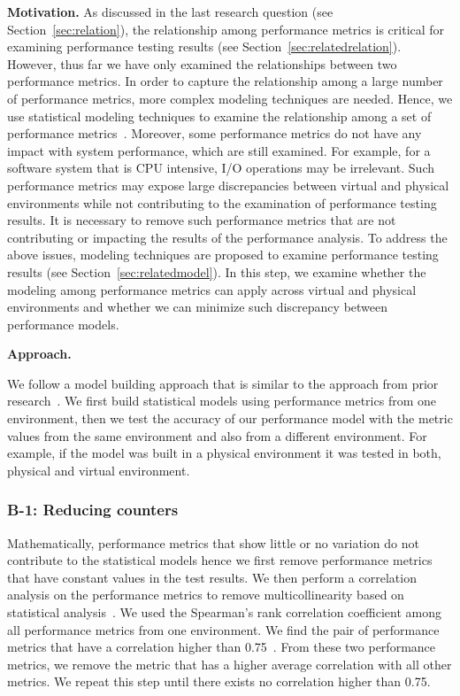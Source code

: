 \documentclass[smallextended]{svjour3}       %
\begin{document}
\noindent \textbf{Motivation.}
As discussed in the last research question (see Section~\ref{sec:relation}), the relationship among performance metrics is critical for examining performance testing results (see Section~\ref{sec:relatedrelation}). However, thus far we have only examined the relationships between two performance metrics. In order to capture the relationship among a large number of performance metrics, more complex modeling techniques are needed. Hence, we use statistical modeling techniques to examine the relationship among a set of performance metrics~\cite{xiong2013vperfguard,cohen2004correlating}. Moreover, some performance metrics do not have any impact with system performance, which are still examined. For example, for a software system that is CPU intensive, I/O operations may be irrelevant. Such performance metrics may expose large discrepancies between virtual and physical environments while not contributing to the examination of performance testing results. It is necessary to remove such performance metrics that are not contributing or impacting the results of the performance analysis. To address the above issues, modeling techniques are proposed to examine performance testing results (see Section~\ref{sec:relatedmodel}). In this step, we examine whether the modeling among performance metrics can apply across virtual and physical environments and whether we can minimize such discrepancy between performance models.


\noindent \textbf{Approach. }

We follow a model building approach that is similar to the approach from prior research~\cite{Shang:2015:ADP:2668930.2688052,Cohen:2005:CIC:1095810.1095821,xiong2013vperfguard}. We first build statistical models using performance metrics from one environment, then we test the accuracy of our performance model with the metric values from the same environment and also from a different environment. For example, if the model was built in a physical environment it was tested in both, physical and virtual environment.

\subsubsection{B-1: Reducing counters}

Mathematically, performance metrics that show little or no variation do not contribute to the statistical models hence we first remove performance metrics that have constant values in the test results. We then perform a correlation analysis on the performance metrics to remove multicollinearity based on statistical analysis~\cite{cor_R}. We used the Spearman's rank correlation coefficient among all performance metrics from one environment. We find the pair of performance metrics that have a correlation higher than 0.75~\cite{Syer2016}. From these two performance metrics, we remove the metric that has a higher average correlation with all other metrics. We repeat this step until there exists no correlation higher than 0.75.
\end{document}
